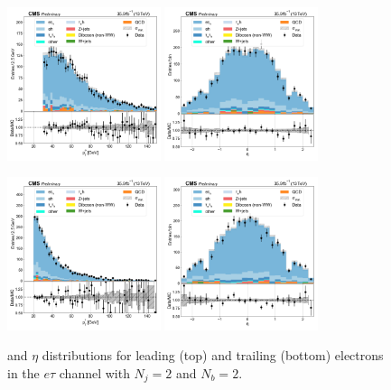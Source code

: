 \begin{figure}[htb!]
    \centering
    \includegraphics[width=0.4\textwidth]{chapters/Appendix/sectionPlots/figures/data_mc_overlays/etau_2016_cat_eq2_eq2_signal_linear_lepton_lepton1_pt}
    \includegraphics[width=0.4\textwidth]{chapters/Appendix/sectionPlots/figures/data_mc_overlays/etau_2016_cat_eq2_eq2_signal_linear_lepton_lepton1_eta}

    \includegraphics[width=0.4\textwidth]{chapters/Appendix/sectionPlots/figures/data_mc_overlays/etau_2016_cat_eq2_eq2_signal_linear_lepton_lepton2_pt}
    \includegraphics[width=0.4\textwidth]{chapters/Appendix/sectionPlots/figures/data_mc_overlays/etau_2016_cat_eq2_eq2_signal_linear_lepton_lepton2_eta}
    \caption{\pt and $\eta$ distributions for leading (top) and trailing
        (bottom) electrons in the $e\tau$ channel with $N_{j} = 2$ and
        $N_{b} = 2$.}
    \label{fig:etau_6_kinematic}
\end{figure}

